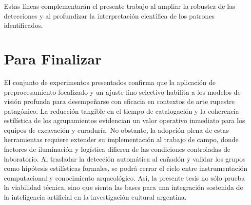 Estas líneas complementarán el presente trabajo al ampliar la robustez de las detecciones y al profundizar la interpretación científica de los patrones identificados.

\section{Para Finalizar}

El conjunto de experimentos presentados confirma que la aplicación de preprocesamiento focalizado y un ajuste fino selectivo habilita a los modelos de visión profunda para desempeñarse con eficacia en contextos de arte rupestre patagónico.
La reducción tangible en el tiempo de catalogación y la coherencia estilística de los agrupamientos evidencian un valor operativo inmediato para los equipos de excavación y curaduría.
No obstante, la adopción plena de estas herramientas requiere extender su implementación al trabajo de campo, donde factores de iluminación y logística difieren de las condiciones controladas de laboratorio.
Al trasladar la detección automática al cañadón y validar los grupos como hipótesis estilísticas formales, se podrá cerrar el ciclo entre instrumentación computacional y conocimiento arqueológico.
Así, la presente tesis no sólo prueba la viabilidad técnica, sino que sienta las bases para una integración sostenida de la inteligencia artificial en la investigación cultural argentina.
